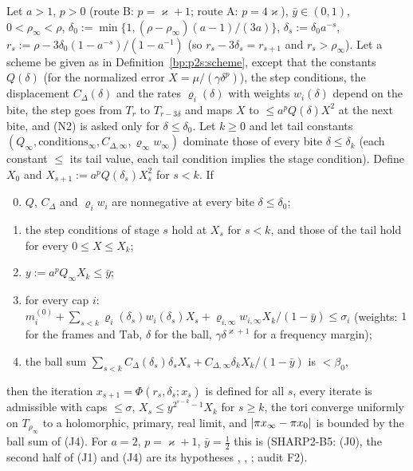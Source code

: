 \begin{proposition}\label{bp:p2s2:engine}
Let $a>1$, $p>0$ (route B: $p=\varkappa+1$; route A: $p=4\varkappa$), $\bar y\in(0,1)$, $0<\rho_\infty<\rho$, $\delta_0:=\min\{1,(\rho-\rho_\infty)(a-1)/(3a)\}$,
$\delta_s:=\delta_0a^{-s}$, $r_s:=\rho-3\delta_0(1-a^{-s})/(1-a^{-1})$ (so $r_s-3\delta_s=r_{s+1}$ and $r_s>\rho_\infty$). Let a scheme be given as in
Definition~\ref{bp:p2s:scheme}, except that the constants $Q(\delta)$ (for the normalized error $X=\mu/(\gamma\delta^{p})$), the step conditions,
the displacement $C_\Delta(\delta)$ and the rates $\varrho_i(\delta)$ with weights $w_i(\delta)$ depend on the bite, the step goes from $T_r$ to $T_{r-3\delta}$
and maps $X$ to $\le a^pQ(\delta)X^2$ at the next bite, and (N2) is asked only for $\delta\le\delta_0$. Let $k\ge0$ and let tail constants
$(Q_\infty,\text{conditions}_\infty,C_{\Delta,\infty},\varrho_\infty w_\infty)$ dominate those of every bite $\delta\le\delta_k$ (each constant $\le$ its tail
value, each tail condition implies the stage condition). Define $X_0$ and $X_{s+1}:=a^pQ(\delta_s)X_s^2$ for $s<k$. If
\begin{enumerate}[label=(J\arabic*)]
\setcounter{enumi}{-1}
\item\label{bp:p2s2:J0} $Q$, $C_\Delta$ and $\varrho_iw_i$ are nonnegative at every bite $\delta\le\delta_0$;
\item\label{bp:p2s2:J1} the step conditions of stage $s$ hold at $X_s$ for $s<k$, and those of the tail hold for every $0\le X\le X_k$;
\item\label{bp:p2s2:J2} $y:=a^pQ_\infty X_k\le\bar y$;
\item\label{bp:p2s2:J3} for every cap $i$: $m^{(0)}_i+\sum_{s<k}\varrho_i(\delta_s)w_i(\delta_s)X_s+\varrho_{i,\infty}w_{i,\infty}X_k/(1-\bar y)\le\sigma_i$ (weights: $1$ for
  the frames and $\mathrm{Tab}$, $\delta$ for the ball, $\gamma\delta^{\varkappa+1}$ for a frequency margin);
\item\label{bp:p2s2:J4} the ball sum $\sum_{s<k}C_\Delta(\delta_s)\delta_sX_s+C_{\Delta,\infty}\delta_kX_k/(1-\bar y)$ is $<\beta_0$,
\end{enumerate}
then the iteration $x_{s+1}=\Phi(r_s,\delta_s;x_s)$ is defined for all $s$, every iterate is admissible with caps $\le\sigma$, $X_s\le y^{2^{s-k}-1}X_k$
for $s\ge k$, the tori converge uniformly on $T_{\rho_\infty}$ to a holomorphic, primary, real limit, and $\lvert \pi x_\infty-\pi x_0\rvert$ is bounded by the
ball sum of (J4). For $a=2$, $p=\varkappa+1$, $\bar y=\frac12$ this is  (SHARP2-B5: (J0), the
second half of (J1) and (J4) are its hypotheses , , ; audit F2).
\end{proposition}

